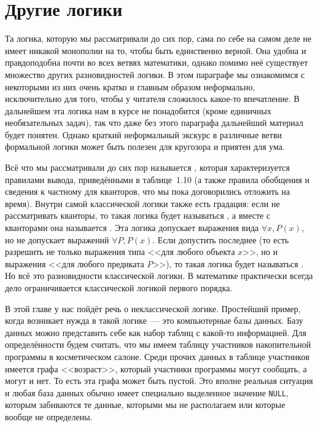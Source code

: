 \section{Другие логики}

Та логика, которую мы рассматривали до сих пор, сама по себе на самом деле не имеет никакой монополии на то, чтобы быть единственно верной. Она удобна и правдоподобна почти во всех ветвях математики, однако помимо неё существует множество других разновидностей логики. В этом параграфе мы ознакомимся с некоторыми из них очень кратко и главным образом неформально, исключительно для того, чтобы у читателя сложилось какое-то впечатление. В дальнейшем эта логика нам в курсе не понадобится (кроме единичных необязательных задач), так что даже без этого параграфа дальнейший материал будет понятен. Однако краткий неформальный экскурс в различные ветви формальной логики может быть полезен для кругозора и приятен для ума.

Всё что мы рассматривали до сих пор называется , которая характеризуется правилами вывода, приведёнными в таблице~1.10 (а также правила обобщения и сведения к частному для кванторов, что мы пока договорились отложить на время). Внутри самой классической логики также есть градация: если не рассматривать кванторы, то такая логика будет называться , а вместе с кванторами она называется . Эта логика допускает выражения вида $\forall x, P(x)$, но не допускает выражений $\forall P, P(x)$. Если допустить последнее (то есть разрешить не только выражения типа <<для любого объекта $x$>>, но и выражения <<для любого предиката $P$>>), то такая логика будет называться . Но всё это разновидности классической логики. В математике практически всегда дело ограничивается классической логикой первого порядка.

В этой главе у нас пойдёт речь о неклассической логике. Простейший пример, когда возникает нужда в такой логике~--- это компьютерные базы данных. Базу данных можно представить себе как набор таблиц с какой-то информацией. Для определённости будем считать, что мы имеем таблицу участников накопительной программы в косметическом салоне. Среди прочих данных в таблице участников имеется графа <<возраст>>, который участники программы могут сообщать, а могут и нет. То есть эта графа может быть пустой. Это вполне реальная ситуация и любая база данных обычно имеет специально выделенное значение \texttt{NULL}, которым забиваются те данные, которыми мы не располагаем или которые вообще не определены.

